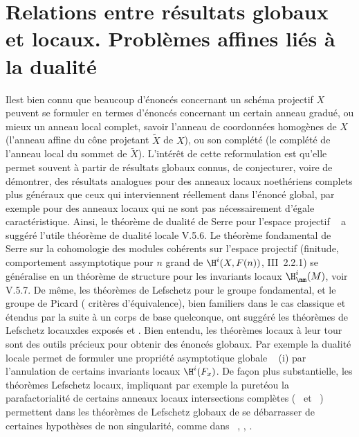 \section[Relations entre r\'esultats globaux et locaux]
{Relations entre r\'esultats globaux et locaux. Probl\`emes affines li\'es \`a la dualit\'e} \label{XIII.1}

Il\pageoriginale est bien connu que beaucoup d'\'enonc\'es concernant un sch\'ema
projectif $X$ peuvent se formuler en termes d'\'enonc\'es concernant
un certain anneau gradu\'e, ou mieux un anneau local complet,
\ignorespaces savoir l'anneau de coordonn\'ees homog\`enes
de $X$ (\ie l'anneau affine du c\^{o}ne projetant $\tilde{X}$ de
$X$), ou son compl\'et\'e (\ie le compl\'et\'e de l'anneau local du sommet
de $\tilde{X}$). L'int\'er\^et de cette reformulation est qu'elle
permet souvent \`a partir de r\'esultats globaux connus, de
conjecturer, voire de d\'emontrer, des r\'esultats analogues pour des
anneaux locaux noeth\'eriens complets plus g\'en\'eraux que ceux qui
interviennent r\'eellement dans l'\'enonc\'e global, par exemple pour
des anneaux locaux qui ne sont pas n\'ecessairement d'\'egale
caract\'eristique. Ainsi, le th\'eor\`eme de dualit\'e de Serre pour
l'espace projectif ~ a sugg\'er\'e l'utile
th\'eor\`eme de dualit\'e locale V.5.6. Le
th\'eor\`eme fondamental de Serre sur la cohomologie des
modules coh\'erents sur l'espace projectif (finitude,
comportement assymptotique pour $n$ grand de $\H^i(X,
F(n))$, {\cf \EGA III~2.2.1}) se g\'en\'eralise en un th\'eor\`eme de
structure pour les invariants locaux $\H^i_{\mm}(M)$, voir
V.5.7. De m\^eme, les th\'eor\`emes de
Lefschetz pour le groupe fondamental, et le groupe de Picard (\og
crit\`eres d'\'equivalence{\fg}), bien familiers dans le cas
classique et \'etendus par la suite \`a un corps de base quelconque,
ont sugg\'er\'e les th\'eor\`emes de Lefschetz \og locaux\fg des expos\'es
 et . Bien entendu, les th\'eor\`emes locaux \`a leur
tour sont des outils pr\'ecieux pour obtenir des \'enonc\'es globaux.
Par exemple la dualit\'e locale permet de formuler une propri\'et\'e
asymptotique globale ~ (i) par l'annulation
de certains invariants locaux $\H^i(F_x)$. De fa\c con plus
substantielle, les th\'eor\`emes Lefschetz locaux, impliquant par
exemple la \og puret\'e\fg ou la parafactorialit\'e de certains
anneaux locaux intersections compl\`etes (~ et
~) permettent dans les th\'eor\`emes de
Lefschetz globaux de se d\'ebarrasser de certaines hypoth\`eses de
non singularit\'e, comme dans ~, ,
.

